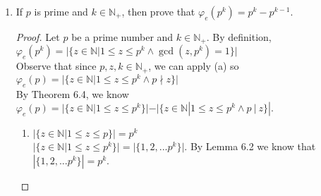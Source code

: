 \documentclass{article}
\newcommand{\naturals}{\mathbb{N}}
\newcommand{\divides}{\:\mathbb{|}\: }
\newcommand{\notdivides}{\nmid}
\begin{document}
\begin{enumerate}
\begin{enumerate}
\begin{proof}
        \end{proof}
\pagebreak
      \item
        If $p$ is prime and $k \in \naturals_+$, then prove that $\varphi_e(p^k) = p^k - p^{k - 1}$.
        \begin{proof}
            Let $p$ be a prime number and $k \in \naturals_+$. By definition, $\varphi_e(p^k)=|\{z \in \naturals| 1 \leq z \leq p^k \land \gcd(z,p^k)=1\}|$\\
            Observe that since $p,z,k \in \naturals_+$, we can apply (a) so $\varphi_e(p)=|\{z \in \naturals| 1 \leq z \leq p^k \land p \notdivides z\}|$\\
            By Theorem 6.4, we know $\varphi_e(p)=|\{z \in \naturals| 1 \leq z \leq p^k\}| - |\{z \in \naturals| 1 \leq z \leq p^k \land p \divides z\}|$.\\
            \begin{enumerate}
                \item $|\{z \in \naturals| 1 \leq z \leq p\}|=p^k$\\
                $|\{z \in \naturals| 1 \leq z \leq p^k\}|=|\{1,2,...p^k\}|$. By Lemma 6.2 we know that $|\{1,2,...p^k\}|=p^k$.\\
                

\end{enumerate}
\end{proof}
\end{enumerate}
\end{enumerate}
\end{document}
